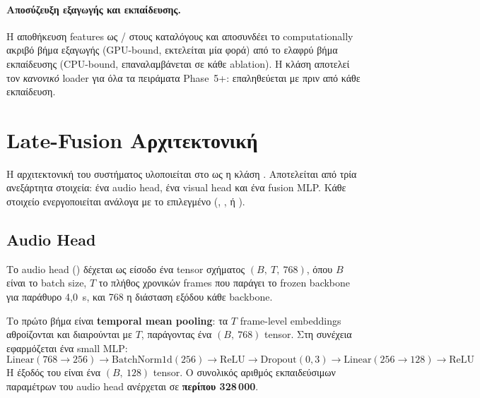 \paragraph{Αποσύζευξη εξαγωγής και εκπαίδευσης.}
Η αποθήκευση features ως  /  στους καταλόγους
 και 
αποσυνδέει το computationally ακριβό βήμα εξαγωγής
(GPU-bound, εκτελείται μία φορά) από το ελαφρύ βήμα εκπαίδευσης
(CPU-bound, επαναλαμβάνεται σε κάθε ablation).
Η κλάση  αποτελεί τον \emph{κανονικό}
loader για όλα τα πειράματα Phase~5+:
επαληθεύεται με 
πριν από κάθε εκπαίδευση.

\section{Late-Fusion Αρχιτεκτονική}
\label{sec:late-fusion-arch}

Η αρχιτεκτονική του συστήματος υλοποιείται στο
 ως η κλάση .
Αποτελείται από τρία ανεξάρτητα στοιχεία:
ένα audio head, ένα visual head και ένα fusion MLP.
Κάθε στοιχείο ενεργοποιείται ανάλογα με το επιλεγμένο
 (, , ή ).

\subsection{Audio Head}
\label{subsec:audio-head}

Το audio head () δέχεται ως είσοδο
ένα tensor σχήματος \((B,\ T,\ 768)\),
όπου \(B\) είναι το batch size,
\(T\) το πλήθος χρονικών frames που παράγει το frozen backbone
για παράθυρο 4{,}0~s,
και 768 η διάσταση εξόδου κάθε backbone.

Το πρώτο βήμα είναι \textbf{temporal mean pooling}:
τα \(T\) frame-level embeddings αθροίζονται και διαιρούνται
με \(T\), παράγοντας ένα \((B,\ 768)\) tensor.
Στη συνέχεια εφαρμόζεται ένα small MLP:
\[
  \text{Linear}(768 \to 256) \to \text{BatchNorm1d}(256) \to \text{ReLU}
  \to \text{Dropout}(0{,}3) \to \text{Linear}(256 \to 128) \to \text{ReLU}
\]
Η έξοδός του είναι ένα \((B,\ 128)\) tensor.
Ο συνολικός αριθμός εκπαιδεύσιμων παραμέτρων του audio head
ανέρχεται σε \textbf{περίπου 328\,000}.

